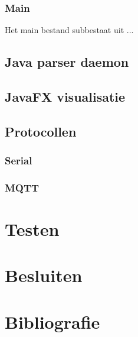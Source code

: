 \documentclass[a4paper]{report}
\begin{document}
\subsection{Main}
Het main bestand subbestaat uit ...

\section{Java parser daemon}

\section{JavaFX visualisatie}

\section{Protocollen}
\subsection{Serial}

\subsection{MQTT}

\chapter{Testen}

\chapter{Besluiten}

\chapter{Bibliografie}
\end{document}

